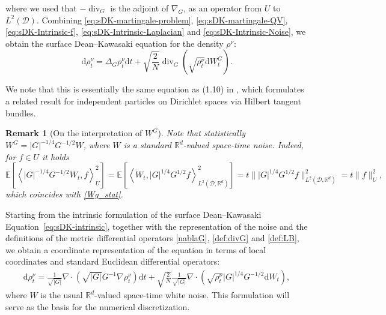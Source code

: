 \documentclass[11pt, a4paper]{article}
\newcommand{\mathd}{\mathrm{d}}
\newtheorem{remark}[theorem]{Remark}%
\begin{document}
where we used that $-\operatorname{div}_G$ is the adjoint of $\nabla_G$, as an operator from $U$ to $L^2(\mathcal{D})$.
Combining \eqref{eq:sDK-martingale-problem}, \eqref{eq:sDK-martingale-QV}, \eqref{eq:sDK-Intrinsic-f}, \eqref{eq:sDK-Intrinsic-Laplacian} and \eqref{eq:sDK-Intrinsic-Noise}, we   obtain the surface Dean--Kawasaki equation for the density $\rho^\nu$:
\begin{equation}\label{eq:sDK-intrinsic}
    \mathd \rho^\nu_t = \Delta_G \rho^\nu_t \mathd t +
   \sqrt{\frac{2}{N}} \operatorname{div}_G \left( \sqrt{\rho^\nu_t} \mathd W^G_t \right).
\end{equation}

We note that this is essentially the same equation as (1.10) in \cite{DelloSchiavo2024massive}, which formulates a related result for independent particles on Dirichlet spaces via Hilbert tangent bundles.

\begin{remark}[On the interpretation of $W^G$]\label{rem:stwn}
Note that statistically $W^G= |G|^{-1/4}G^{-1/2}W$, where $W$ is a standard $\mathbb{R}^d$-valued space-time noise. Indeed, for $f\in U$ it holds
\[
    \mathbb{E}\left[\left<|G|^{-1/4}G^{-1/2}W_t, f\right>^2_U\right] = %
    \mathbb{E}\left[\left<W_t, |G|^{1/4}G^{1/2}f\right>^2_{L^2(\mathcal{D}, \mathbb{R}^d)}\right]
    =t \||G|^{1/4}G^{1/2}f\|^2_{L^2(\mathcal{D}, \mathbb{R}^d)}=t\|f\|^2_U,
\]
which coincides with \eqref{Wg_stat}.
\end{remark}

Starting from the intrinsic formulation of the surface Dean–Kawasaki Equation~\eqref{eq:sDK-intrinsic}, together with the representation of the noise and the definitions of the metric differential operators \eqref{nablaG}, \eqref{def:divG} and \eqref{def:LB}, we obtain a coordinate representation of the equation in terms of local coordinates and standard Euclidean differential operators: 
\begin{eqnarray}\label{eq:numDK}
    \mathd\rho^\nu_t = \frac{1}{\sqrt{|G|}} \nabla \cdot (\sqrt{|G|} G^{-1}  \nabla \rho^\nu_t) \mathd t + \sqrt{\frac{2}{N}} \frac{1}{\sqrt{|G|}}\nabla \cdot (\sqrt{\rho^\nu_t} | G |^{1 / 4} G^{- 1 / 2} \mathd W_t ),
\end{eqnarray}
where $W$ is the usual $\mathbb{R}^d$-valued space-time white noise. This formulation will serve as the basis for the numerical discretization.
\end{document}
